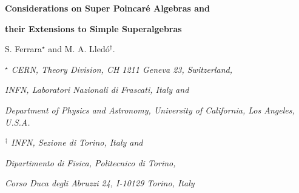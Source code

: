 \documentclass[a4paper,12pt]{article}
\begin{document}

\newcommand{\id}{\relax{\rm 1\kern-.35em 1}}

\newcommand{\Z}{\mathbb{Z}}
\newcommand{\R}{\mathbb{R}}
\newcommand{\C}{\mathbb{C}}
\newcommand{\N}{\mathbb{N}}
\newcommand{\Ha}{\mathbb{H}}

\newcommand{\fiso}{\mathfrak{iso}}
\newcommand{\fso}{\mathfrak{so}}
\newcommand{\fosp}{\mathfrak{osp}}
\newcommand{\fsp}{\mathfrak{sp}}
\newcommand{\fsl}{\mathfrak{sl}}
\newcommand{\fsu}{\mathfrak{su}}
\newcommand{\fspin}{\mathfrak{spin}}
\newcommand{\ff}{\mathfrak{f}}
\newcommand{\fg}{\mathfrak{g}}
\newcommand{\fu}{\mathfrak{u}}
\newcommand{\fo}{\mathfrak{o}}
\newcommand{\fgl}{\mathfrak{gl}}
\newcommand{\fii}{\mathfrak{i}}
\newcommand{\fusp}{\mathfrak{usp}}

\newcommand{\g}{\mathcal{G}}
\newcommand{\s}{\mathcal{S}}
\newcommand{\ka}{\mathcal{K}}
\newcommand{\p}{\mathcal{P}}
\newcommand{\A}{\mathcal{A}}
\newcommand{\I}{\mathcal{I}}
\newcommand{\Ca}{\mathcal{C}}
\newcommand{\La}{\mathcal{L}}
\newcommand{\Qa}{\mathcal{Q}}


\vskip 1.5cm


  \centerline{\LARGE \bf Considerations on Super Poincar\'e Algebras and  }

  \smallskip

\centerline{\LARGE \bf  their Extensions to Simple Superalgebras }
 \vskip 3cm
\centerline{S. Ferrara$^\star$ and M. A. Lled\'o$^\dagger$.}

\vskip 1.5cm





\centerline{\it $^\star$ CERN, Theory Division, CH 1211 Geneva 23,
Switzerland, } \centerline{\it INFN, Laboratori Nazionali di
Frascati, Italy and } \centerline{\it Department of Physics and
Astronomy, University of California, Los Angeles, U.S.A.}

\medskip

\centerline{\it $^\dagger$  INFN, Sezione di Torino, Italy and }
\centerline{\it Dipartimento di Fisica, Politecnico di Torino,}
\centerline{\it Corso Duca degli Abruzzi 24, I-10129 Torino,
Italy}



\vskip 1cm

\begin{abstract}
We consider simple superalgebras which are a supersymmetric
extension of the spin algebra in the cases where the number of odd
generators does not exceed 64. All of them contain a super
Poincar\'e algebra as a contraction  and another as  a subalgebra.
Because of the contraction property, some of these algebras can be
interpreted as de Sitter or  anti de Sitter superalgebras.
However, the number of odd generators present in the contraction
is not always minimal due to the different splitting properties of
the spinor representations under a subalgebra.  We consider the
general case, with arbitrary dimension and signature, and examine
in detail particular  examples with physical implications in
dimensions $d=10$ and $d=4$.
\end{abstract}
\end{document}
